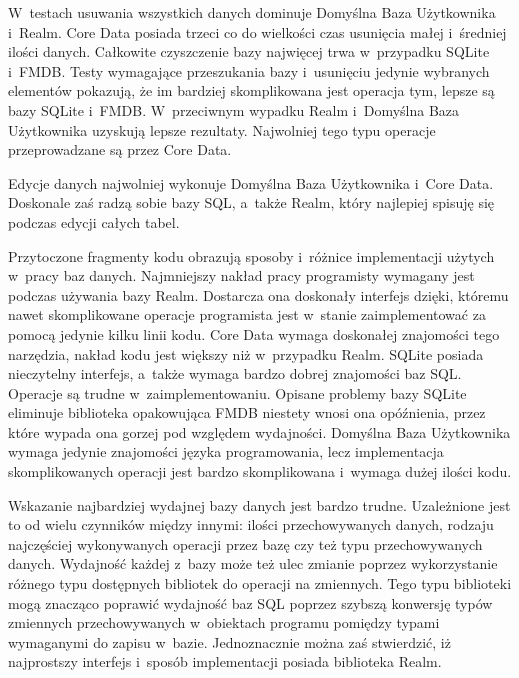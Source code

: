  W~testach usuwania wszystkich danych dominuje Domyślna Baza Użytkownika i~Realm. Core Data posiada trzeci co do wielkości czas usunięcia małej i~średniej ilości danych. Całkowite czyszczenie bazy najwięcej trwa w~przypadku SQLite i~FMDB.  Testy wymagające przeszukania bazy i~usunięciu jedynie wybranych elementów pokazują, że im bardziej skomplikowana jest operacja tym, lepsze są bazy SQLite i~FMDB. W~przeciwnym wypadku Realm i~Domyślna Baza Użytkownika uzyskują lepsze rezultaty. Najwolniej tego typu operacje przeprowadzane są przez Core Data. 

Edycje danych najwolniej wykonuje Domyślna Baza Użytkownika i~Core Data. Doskonale zaś radzą sobie bazy SQL, a~także Realm, który najlepiej spisuję się podczas edycji całych tabel. 

Przytoczone fragmenty kodu obrazują sposoby i~różnice implementacji użytych w~pracy baz danych. Najmniejszy nakład pracy programisty wymagany jest podczas używania bazy Realm. Dostarcza ona doskonały interfejs dzięki, któremu nawet skomplikowane operacje programista jest w~stanie zaimplementować za pomocą jedynie kilku linii kodu. Core Data wymaga doskonałej znajomości tego narzędzia, nakład kodu jest większy niż w~przypadku Realm. SQLite posiada nieczytelny interfejs, a~także wymaga bardzo dobrej znajomości baz SQL. Operacje są trudne w~zaimplementowaniu. Opisane problemy bazy SQLite eliminuje biblioteka opakowująca FMDB niestety wnosi ona opóźnienia, przez które wypada ona gorzej pod względem wydajności. Domyślna Baza Użytkownika wymaga jedynie znajomości języka programowania, lecz implementacja skomplikowanych operacji jest bardzo skomplikowana i~wymaga dużej ilości kodu. 

Wskazanie najbardziej wydajnej bazy danych jest bardzo trudne. Uzależnione jest to od wielu czynników między innymi: ilości przechowywanych danych, rodzaju najczęściej wykonywanych operacji przez bazę czy też typu przechowywanych danych. Wydajność każdej z~bazy może też ulec zmianie poprzez wykorzystanie różnego typu dostępnych bibliotek do operacji na zmiennych. Tego typu biblioteki mogą znacząco poprawić wydajność baz SQL poprzez szybszą konwersję typów zmiennych przechowywanych w~obiektach programu pomiędzy typami wymaganymi do zapisu w~bazie. Jednoznacznie można zaś stwierdzić, iż najprostszy interfejs i~sposób implementacji posiada biblioteka Realm.
